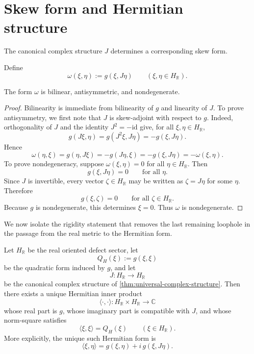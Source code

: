 \section{Skew form and Hermitian structure}
\label{sec:hilbert-skew-hermitian}
The canonical complex structure \(J\) determines a corresponding skew
form.
\begin{definition}
	Define
	\[
		\omega(\xi,\eta):=g(\xi,J\eta)
		\qquad
		(\xi,\eta\in H_{\mathbb R}).
	\]
\end{definition}
\begin{proposition}
	The form \(\omega\) is bilinear, antisymmetric, and nondegenerate.
\end{proposition}
\begin{proof}
	Bilinearity is immediate from bilinearity of \(g\) and linearity of
	\(J\).
	To prove antisymmetry, we first note that \(J\) is skew-adjoint with
	respect to \(g\).
	Indeed, orthogonality of \(J\) and the identity \(J^{2}=-\mathrm{id}\)
	give, for all \(\xi,\eta\in H_{\mathbb R}\),
	\[
		g(J\xi,\eta)
		=
		g(J^{2}\xi,J\eta)
		=
		-g(\xi,J\eta).
	\]
	Hence
	\[
		\omega(\eta,\xi)
		=
		g(\eta,J\xi)
		=
		-g(J\eta,\xi)
		=
		-g(\xi,J\eta)
		=
		-\omega(\xi,\eta).
	\]
	To prove nondegeneracy, suppose \(\omega(\xi,\eta)=0\) for all
	\(\eta\in H_{\mathbb R}\).
	Then
	\[
		g(\xi,J\eta)=0
		\qquad
		\text{for all }\eta.
	\]
	Since \(J\) is invertible, every vector \(\zeta\in H_{\mathbb R}\) may
	be written as \(\zeta=J\eta\) for some \(\eta\).
	Therefore
	\[
		g(\xi,\zeta)=0
		\qquad
		\text{for all }\zeta\in H_{\mathbb R}.
	\]
	Because \(g\) is nondegenerate, this determines \(\xi=0\).
	Thus \(\omega\) is nondegenerate.
\end{proof}
We now isolate the rigidity statement that removes the last remaining
loophole in the passage from the real metric to the Hermitian form.
\begin{lemma}
	\label{lem:polarization-rigidity}
	Let \(H_{\mathbb R}\) be the real oriented defect sector, let
	\[
		Q_H(\xi):=g(\xi,\xi)
	\]
	be the quadratic form induced by \(g\), and let
	\[
		J:H_{\mathbb R}\to H_{\mathbb R}
	\]
	be the canonical complex structure of
	\cref{thm:universal-complex-structure}.
	Then there exists a unique Hermitian inner product
	\[
		\langle\cdot,\cdot\rangle:H_{\mathbb R}\times H_{\mathbb R}\to\mathbb C
	\]
	whose real part is \(g\), whose imaginary part is compatible with \(J\),
	and whose norm-square satisfies
	\[
		\langle \xi,\xi\rangle = Q_H(\xi)
		\qquad
		(\xi\in H_{\mathbb R}).
	\]
	More explicitly, the unique such Hermitian form is
	\[
		\langle \xi,\eta\rangle
		=
		g(\xi,\eta)+ i\, g(\xi,J\eta).
	\]
\end{lemma}
